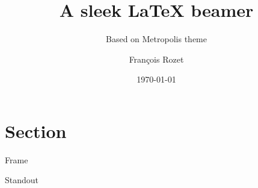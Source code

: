 \documentclass[12pt]{beamer}
\title{A sleek \LaTeX{} beamer}
\subtitle{Based on Metropolis theme}
\author{François Rozet}
\institute{University of Liège}
\date{\today}
\begin{document}
\maketitle

\section{Section}

\begin{frame}
\end{frame}

\begin{frame}{Frame}
\end{frame}

\begin{frame}[standout]
  Standout
\end{frame}

\begin{frame}
    \nocite{einstein}
    \nocite{knuthwebsite}
    \printbibliography
\end{frame}
\end{document}
